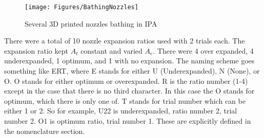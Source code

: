 \begin{figure}[h!]
\centering
\texttt{[image: Figures/BathingNozzles]}
\caption{Several 3D printed nozzles bathing in IPA}
\label{fig:BathingNozzles}
\end{figure}
There were a total of 10 nozzle expansion ratios used with 2 trials each. The expansion ratio kept $A_t$ constant and varied $A_e$. There were 4 over expanded, 4 underexpanded, 1 optimum, and 1 with no expansion. The naming scheme goes something like ERT, where E stands for either U (Underexpanded), N (None), or O. O stands for either optimum or overexpanded. R is the ratio number (1-4) except in the case that there is no third character. In this case the O stands for optimum, which there is only one of. T stands for trial number which can be either 1 or 2. So for example, U22 is underexpanded, ratio number 2, trial number 2. O1 is optimum ratio, trial number 1. These are explicitly defined in the nomenclature section.%
%
%
%
%
%
%
%
%
%
%
%
%
%
%
%
%
%
%
%
